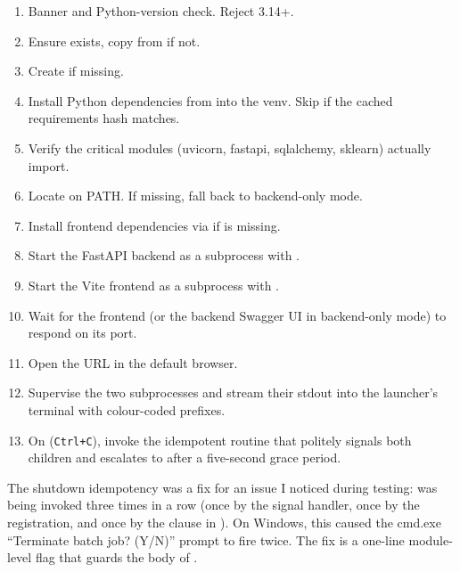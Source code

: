 \begin{enumerate}
  \item Banner and Python-version check. Reject 3.14+.
  \item Ensure  exists, copy from
     if not.
  \item Create  if missing.
  \item Install Python dependencies from
     into the venv. Skip if the cached
    requirements hash matches.
  \item Verify the critical modules (uvicorn, fastapi,
    sqlalchemy, sklearn) actually import.
  \item Locate  on PATH. If missing, fall back to
    backend-only mode.
  \item Install frontend dependencies via
     if  is missing.
  \item Start the FastAPI backend as a subprocess with
    .
  \item Start the Vite frontend as a subprocess with
    .
  \item Wait for the frontend (or the backend Swagger UI in
    backend-only mode) to respond on its port.
  \item Open the URL in the default browser.
  \item Supervise the two subprocesses and stream their stdout
    into the launcher's terminal with colour-coded prefixes.
  \item On  (\verb|Ctrl+C|), invoke the idempotent
     routine that politely signals both
    children and escalates to  after a five-second
    grace period.
\end{enumerate}

The shutdown idempotency was a fix for an issue I noticed during
testing:  was being invoked three times in a
row (once by the signal handler, once by the 
registration, and once by the  clause in
). On Windows, this caused the cmd.exe
``Terminate batch job? (Y/N)'' prompt to fire twice. The fix is a
one-line module-level flag that guards the body of
.
